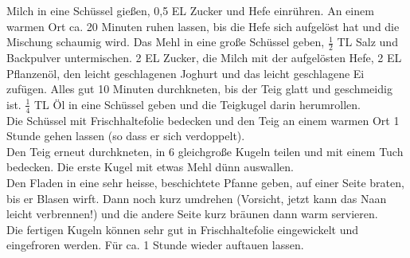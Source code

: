 \vspace*{\fill}
\begin{multicols}{2}



Milch in eine Schüssel gießen, 0,5 EL Zucker und Hefe einrühren.
An einem warmen Ort ca. 20 Minuten ruhen lassen, bis die Hefe sich aufgelöst hat und die Mischung schaumig wird.
Das Mehl in eine große Schüssel geben, $\frac{1}{2}$ TL Salz und Backpulver untermischen. 2 EL Zucker, 
die Milch mit der aufgelösten Hefe, 2 EL Pflanzenöl, den leicht geschlagenen Joghurt 
und das leicht geschlagene Ei zufügen. Alles gut 10 Minuten durchkneten, bis der Teig glatt und geschmeidig ist.
$\frac{1}{4}$ TL Öl in eine Schüssel geben und die Teigkugel darin herumrollen.\\

Die Schüssel mit Frischhaltefolie bedecken und den Teig an einem warmen Ort 1 Stunde gehen lassen 
(so dass er sich verdoppelt).\\

Den Teig erneut durchkneten, in 6 gleichgroße Kugeln teilen und mit einem Tuch bedecken.
Die erste Kugel mit etwas Mehl dünn auswallen.\\
 
Den Fladen in eine sehr heisse, beschichtete Pfanne geben,
auf einer Seite braten, bis er Blasen wirft. Dann noch kurz umdrehen (Vorsicht, jetzt kann das Naan leicht verbrennen!) 
und die andere Seite kurz bräunen dann warm servieren.\\ 

Die fertigen Kugeln können sehr gut in Frischhaltefolie eingewickelt und eingefroren werden. 
Für ca. 1 Stunde wieder auftauen lassen. 



\end{multicols}
\vfill
